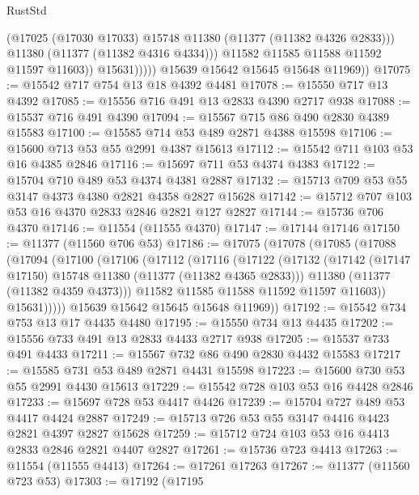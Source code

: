 \begin{lexlean}{RustStd}
\begin{coremodule}
                        (@17025 (@17030 @17033) @15748 @11380 (@11377 (@11382 @4326 @2833)))
                        @11380
                        (@11377 (@11382 @4316 @4334)))
                      @11582
                      @11585
                      @11588
                      @11592
                      @11597
                      @11603))
                  @15631)))))
        @15639
        @15642
        @15645
        @15648
        @11969))
@17075 := @15542 @717 @754 @13 @18 @4392 @4481
@17078 := @15550 @717 @13 @4392
@17085 := @15556 @716 @491 @13 @2833 @4390 @2717 @938
@17088 := @15537 @716 @491 @4390
@17094 := @15567 @715 @86 @490 @2830 @4389 @15583
@17100 := @15585 @714 @53 @489 @2871 @4388 @15598
@17106 := @15600 @713 @53 @55 @2991 @4387 @15613
@17112 := @15542 @711 @103 @53 @16 @4385 @2846
@17116 := @15697 @711 @53 @4374 @4383
@17122 := @15704 @710 @489 @53 @4374 @4381 @2887
@17132 := @15713 @709 @53 @55 @3147 @4373 @4380 @2821 @4358 @2827 @15628
@17142 := @15712 @707 @103 @53 @16 @4370 @2833 @2846 @2821 @127 @2827
@17144 := @15736 @706 @4370
@17146 := @11554 (@11555 @4370)
@17147 := @17144 @17146
@17150 := @11377 (@11560 @706 @53)
@17186 := @17075
    (@17078
      (@17085
        (@17088
          (@17094
            (@17100
              (@17106
                (@17112
                  (@17116
                    (@17122
                      (@17132
                        (@17142 (@17147 @17150) @15748 @11380 (@11377 (@11382 @4365 @2833)))
                        @11380
                        (@11377 (@11382 @4359 @4373)))
                      @11582
                      @11585
                      @11588
                      @11592
                      @11597
                      @11603))
                  @15631)))))
        @15639
        @15642
        @15645
        @15648
        @11969))
@17192 := @15542 @734 @753 @13 @17 @4435 @4480
@17195 := @15550 @734 @13 @4435
@17202 := @15556 @733 @491 @13 @2833 @4433 @2717 @938
@17205 := @15537 @733 @491 @4433
@17211 := @15567 @732 @86 @490 @2830 @4432 @15583
@17217 := @15585 @731 @53 @489 @2871 @4431 @15598
@17223 := @15600 @730 @53 @55 @2991 @4430 @15613
@17229 := @15542 @728 @103 @53 @16 @4428 @2846
@17233 := @15697 @728 @53 @4417 @4426
@17239 := @15704 @727 @489 @53 @4417 @4424 @2887
@17249 := @15713 @726 @53 @55 @3147 @4416 @4423 @2821 @4397 @2827 @15628
@17259 := @15712 @724 @103 @53 @16 @4413 @2833 @2846 @2821 @4407 @2827
@17261 := @15736 @723 @4413
@17263 := @11554 (@11555 @4413)
@17264 := @17261 @17263
@17267 := @11377 (@11560 @723 @53)
@17303 := @17192
    (@17195

\end{coremodule}
\end{lexlean}
